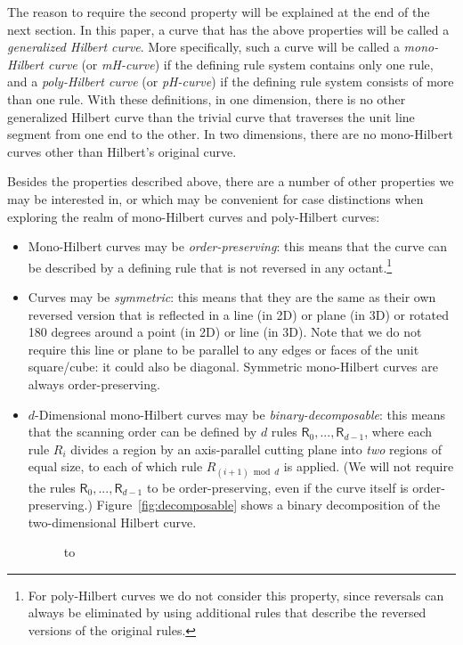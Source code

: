 \documentclass[11pt,a4paper]{article}
\begin{document}
The reason to require the second property will be explained at the end of the next section. In this paper, a curve that has the above properties will be called a \emph{generalized Hilbert curve}. More specifically, such a curve will be called a \emph{mono-Hilbert curve} (or \emph{mH-curve}) if the defining rule system contains only one rule, and a \emph{poly-Hilbert curve} (or \emph{pH-curve}) if the defining rule system consists of more than one rule. With these definitions, in one dimension, there is no other generalized Hilbert curve than the trivial curve that traverses the unit line segment from one end to the other. In two dimensions, there are no mono-Hilbert curves other than Hilbert's original curve.

Besides the properties described above, there are a number of other properties we may be interested in, or which may be convenient for case distinctions when exploring the realm of mono-Hilbert curves and poly-Hilbert curves:\begin{itemize}
\item Mono-Hilbert curves may be \emph{order-preserving}: this means that the curve can be described by a defining rule that is not reversed in any octant.\footnote{For poly-Hilbert curves we do not consider this property, since reversals can always be eliminated by using additional rules that describe the reversed versions of the original rules.}
\item Curves may be \emph{symmetric}: this means that they are the same as their own reversed version that is reflected in a line (in 2D) or plane (in 3D) or rotated 180 degrees around a point (in 2D) or line (in 3D). Note that we do not require this line or plane to be parallel to any edges or faces of the unit square/cube: it could also be diagonal. Symmetric mono-Hilbert curves are always order-preserving.
\item $d$-Dimensional mono-Hilbert curves may be \emph{binary-decomposable}: this means that the scanning order can be defined by $d$ rules $\mathsf{R}_0, ..., \mathsf{R}_{d-1}$, where each rule $R_i$ divides a region by an axis-parallel cutting plane into \emph{two} regions of equal size, to each of which rule $R_{(i+1)\bmod d}$ is applied. (We will not require the rules $\mathsf{R}_0, ..., \mathsf{R}_{d-1}$ to be order-preserving, even if the curve itself is order-preserving.) Figure~\ref{fig:decomposable} shows a binary decomposition of the two-dimensional Hilbert curve.
\begin{figure}
\centering
\hbox to 
\end{figure}
\end{itemize}
\end{document}
